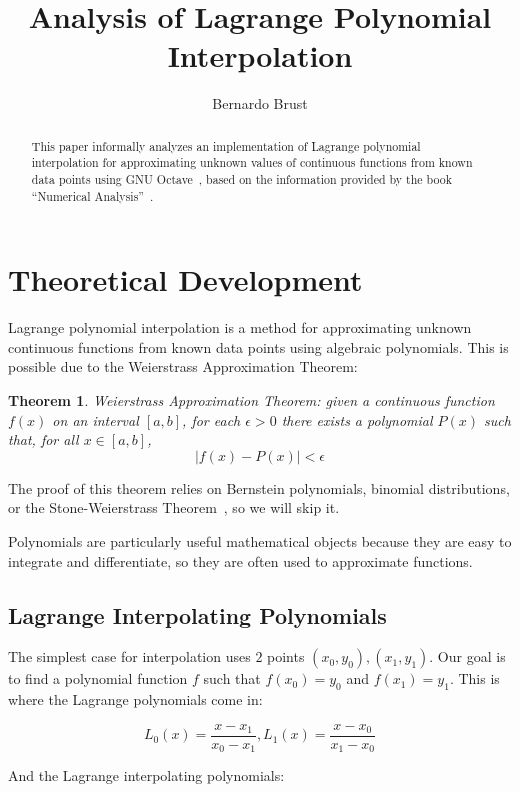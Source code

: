 \documentclass[12pt]{article}
\title{Analysis of Lagrange Polynomial Interpolation}
\author{Bernardo Brust}
\theoremstyle{plain}
\newtheorem*{theorem*}{Theorem}
\theoremstyle{remark}
\begin{document}
\maketitle

\begin{abstract}
  This paper informally analyzes an implementation of Lagrange polynomial interpolation for approximating unknown values of continuous functions from known data points using GNU Octave~\cite{octave}, based on the information provided by the book ``Numerical Analysis''~\cite{book}.
\end{abstract}

\section{Theoretical Development}\label{sec:intro}

Lagrange polynomial interpolation is a method for approximating unknown continuous functions from known data points using algebraic polynomials. This is possible due to the Weierstrass Approximation Theorem:

\begin{theorem*}
  Weierstrass Approximation Theorem: given a continuous function $f(x)$ on an interval $[a, b]$, for each $\epsilon > 0$ there exists a polynomial $P(x)$ such that, for all $x \in [a, b]$,
  \[
    |f(x) - P(x)| < \epsilon
  \]
\end{theorem*}

The proof of this theorem relies on Bernstein polynomials, binomial distributions, or the Stone-Weierstrass Theorem~\cite{proofwiki-weierstrass_approximation}, so we will skip it.

Polynomials are particularly useful mathematical objects because they are easy to integrate and differentiate, so they are often used to approximate functions.

\subsection{Lagrange Interpolating Polynomials}

The simplest case for interpolation uses $2$ points $(x_0, y_0), (x_1, y_1)$. Our goal is to find a polynomial function $f$ such that $f(x_0) = y_0$ and $f(x_1) = y_1$. This is where the Lagrange polynomials come in:

\[
  L_0(x) = \frac{x - x_1}{x_0 - x_1}, L_1(x) = \frac{x - x_0}{x_1 - x_0}
\]

And the Lagrange interpolating polynomials:
\end{document}
